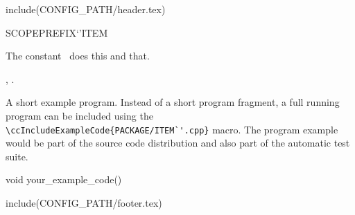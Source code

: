 include(CONFIG_PATH/header.tex)
\begin{ccRefConstant}SCOPE{PREFIX`'ITEM}  %


\ccDefinition
  
The constant \ccRefName\ does this and that.



\ccSeeAlso

,
.

\ccExample

A short example program.
Instead of a short program fragment, a full running program can be
included using the 
\verb|\ccIncludeExampleCode{PACKAGE/ITEM`'.cpp}| 
macro. The program example would be part of the source code distribution and
also part of the automatic test suite.

\begin{ccExampleCode}
void your_example_code() {
}
\end{ccExampleCode}


\end{ccRefConstant}

include(CONFIG_PATH/footer.tex)
